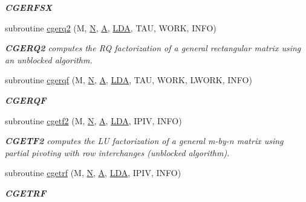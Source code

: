 \begin{DoxyCompactItemize}
\begin{DoxyCompactList}\small\item\em {\bfseries C\+G\+E\+R\+F\+S\+X} \end{DoxyCompactList}\item 
subroutine \hyperlink{group__complexGEcomputational_ga6e2b93235b0ed01d7ddb3fa293e9c45d}{cgerq2} (M, \hyperlink{polmisc_8c_a0240ac851181b84ac374872dc5434ee4}{N}, \hyperlink{classA}{A}, \hyperlink{example__user_8c_ae946da542ce0db94dced19b2ecefd1aa}{L\+D\+A}, T\+A\+U, W\+O\+R\+K, I\+N\+F\+O)
\begin{DoxyCompactList}\small\item\em {\bfseries C\+G\+E\+R\+Q2} computes the R\+Q factorization of a general rectangular matrix using an unblocked algorithm. \end{DoxyCompactList}\item 
subroutine \hyperlink{group__complexGEcomputational_ga41b858b70f94d64cf34df25b287f1af8}{cgerqf} (M, \hyperlink{polmisc_8c_a0240ac851181b84ac374872dc5434ee4}{N}, \hyperlink{classA}{A}, \hyperlink{example__user_8c_ae946da542ce0db94dced19b2ecefd1aa}{L\+D\+A}, T\+A\+U, W\+O\+R\+K, L\+W\+O\+R\+K, I\+N\+F\+O)
\begin{DoxyCompactList}\small\item\em {\bfseries C\+G\+E\+R\+Q\+F} \end{DoxyCompactList}\item 
subroutine \hyperlink{group__complexGEcomputational_gad3da89f6345c89a215bb9010da688a8b}{cgetf2} (M, \hyperlink{polmisc_8c_a0240ac851181b84ac374872dc5434ee4}{N}, \hyperlink{classA}{A}, \hyperlink{example__user_8c_ae946da542ce0db94dced19b2ecefd1aa}{L\+D\+A}, I\+P\+I\+V, I\+N\+F\+O)
\begin{DoxyCompactList}\small\item\em {\bfseries C\+G\+E\+T\+F2} computes the L\+U factorization of a general m-\/by-\/n matrix using partial pivoting with row interchanges (unblocked algorithm). \end{DoxyCompactList}\item 
subroutine \hyperlink{group__complexGEcomputational_gaed8e85049ecfb314d259bfdb3908a60d}{cgetrf} (M, \hyperlink{polmisc_8c_a0240ac851181b84ac374872dc5434ee4}{N}, \hyperlink{classA}{A}, \hyperlink{example__user_8c_ae946da542ce0db94dced19b2ecefd1aa}{L\+D\+A}, I\+P\+I\+V, I\+N\+F\+O)
\begin{DoxyCompactList}\small\item\em {\bfseries C\+G\+E\+T\+R\+F} \end{DoxyCompactList}\item 

\end{DoxyCompactItemize}
